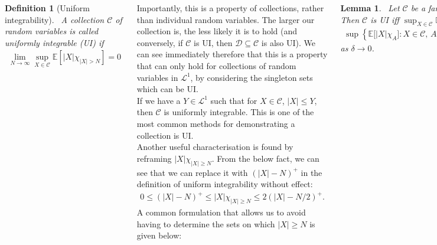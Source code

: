 \documentclass{tikzposter} %
\newtheorem{theorem}{Theorem}
\newtheorem{lemma}[theorem]{Lemma}
\newtheorem{definition}{Definition}
\begin{document}
\begin{columns}
{    \begin{definition}[Uniform integrability]
    \ A collection $\mathcal{C}$ of random variables is called uniformly integrable (UI) if
    \begin{align*}
      \lim_{N \to \infty} \sup_{X \in \mathcal{C}} \mathbb{E}[|X| \chi_{|X|>N}] = 0
    \end{align*}
    \end{definition}
    \hphantom{}

    Importantly, this is a property of collections, rather than individual random variables. The larger our collection is, the less likely it is to hold (and conversely, if $\mathcal{C}$ is UI, then $\mathcal{D} \subseteq \mathcal{C}$ is also UI). We can see immediately therefore that this is a property that can only hold for collections of random variables in $\mathcal{L}^{1}$, by considering the singleton sets which can be UI. \\

    If we have a $Y \in \mathcal{L}^{1}$ such that for $X \in \mathcal{C}$, $|X| \le Y$, then $\mathcal{C}$ is uniformly integrable. This is one of the most common methods for demonstrating a collection is UI. \\

    Another useful characterisation is found by reframing $|X|\chi_{|X| \ge N}$. From the below fact, we can see that we can replace it with $(|X|-N)^{+}$ in the definition of uniform integrability without effect:
    \begin{align*}
      0 \le (|X|-N)^{+} \le |X|\chi_{|X| \ge N} \le 2(|X|-N/2)^{+}.
    \end{align*}
    A common formulation that allows us to avoid having to determine the sets on which $|X| \ge N$ is given below:
    \begin{lemma}
      \ Let $\mathcal{C}$ be a family of random variables. Then $\mathcal{C}$ is UI iff $\displaystyle \sup_{X \in \mathcal{C}} \mathbb{E}\big[|X|\big] < \infty$ and
      \begin{align*}
        \sup \left\{\mathbb{E}\big[|X|\chi_{A}\big] : X \in \mathcal{C},\,A \in \mathcal{F},\, \mathbb{P}(A) \le \delta\right\} \to 0
      \end{align*}
      as $\delta \to 0$.
    \end{lemma}
    \hphantom{}

    \begin{theorem}[Vitali's convergence theorem]
    \ Take $(X_{n})$ a sequence of integrable random variables which converge in probability to a random variable $X$. The following are equivalent:
    \begin{enumerate}[label=\roman*.]
            \item $\{X_{n} : n \ge 1\}$ is uniformly integrable.
            \item $X \in \mathcal{L}^{1}$ and $\mathbb{E}\big[|X_{n}-X|\big] \to 0$ as $n \to \infty$.
            \item $X \in \mathcal{L}^{1}$ and $\mathbb{E}\big[|X_{n}|\big] \to \mathbb{E}\big[|X|\big]$ as $n \to \infty$.
    \end{enumerate}
    \end{theorem}
    \hphantom{}

}
\end{columns}
\end{document}
